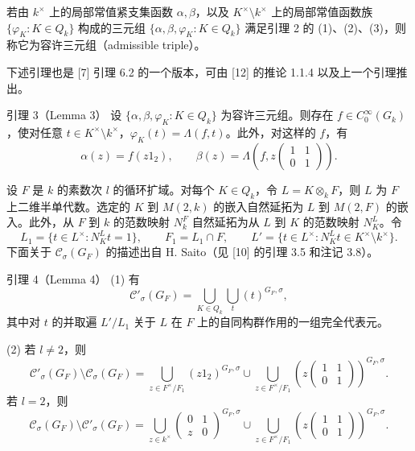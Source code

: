 若由 $k^\times$ 上的局部常值紧支集函数 $\alpha,\beta$，以及 $K^\times\setminus k^\times$ 上的局部常值函数族 $\{\varphi_K:K\in Q_k\}$ 构成的三元组 $\{\alpha,\beta,\varphi_K:K\in Q_k\}$ 满足引理 2 的 (1)、(2)、(3)，则称它为容许三元组（admissible triple）。

下述引理也是 [7] 引理 6.2 的一个版本，可由 [12] 的推论 1.1.4 以及上一个引理推出。

\begin{originaltheorem}{引理 3（Lemma 3）}
设 $\{\alpha,\beta,\varphi_K:K\in Q_k\}$ 为容许三元组。则存在 $f\in C_0^\infty(G_k)$，使对任意 $t\in K^\times\setminus k^\times$，$\varphi_K(t)=\Lambda(f,t)$。此外，对这样的 $f$，有
\[
 \alpha(z)=f(z1_2),\qquad
 \beta(z)=\Lambda\left(f,z\begin{pmatrix}1&1\\0&1\end{pmatrix}\right).
\]
\end{originaltheorem}

设 $F$ 是 $k$ 的素数次 $l$ 的循环扩域。对每个 $K\in Q_k$，令 $L=K\otimes_kF$，则 $L$ 为 $F$ 上二维半单代数。选定的 $K$ 到 $M(2,k)$ 的嵌入自然延拓为 $L$ 到 $M(2,F)$ 的嵌入。此外，从 $F$ 到 $k$ 的范数映射 $N_k^F$ 自然延拓为从 $L$ 到 $K$ 的范数映射 $N_K^L$。令
\[
 L_1=\{t\in L^\times:N_K^Lt=1\},\qquad F_1=L_1\cap F,
 \qquad L'=\{t\in L^\times:N_K^Lt\in K^\times\setminus k^\times\}.
\]
下面关于 $\mathcal C_\sigma(G_F)$ 的描述出自 H. Saito（见 [10] 的引理 3.5 和注记 3.8）。

\begin{originaltheorem}{引理 4（Lemma 4）}
(1) 有
\[
 \mathcal C'_\sigma(G_F)=\bigcup_{K\in Q_k}\bigcup_t(t)^{G_F,\sigma},
\]
其中对 $t$ 的并取遍 $L'/L_1$ 关于 $L$ 在 $F$ 上的自同构群作用的一组完全代表元。

(2) 若 $l\ne2$，则
\[
 \mathcal C'_\sigma(G_F)\setminus\mathcal C_\sigma(G_F)
 =\bigcup_{z\in F^\times/F_1}(z1_2)^{G_F,\sigma}
 \cup\bigcup_{z\in F^\times/F_1}
 \left(z\begin{pmatrix}1&1\\0&1\end{pmatrix}\right)^{G_F,\sigma}.
\]
若 $l=2$，则
\[
 \mathcal C_\sigma(G_F)\setminus\mathcal C'_\sigma(G_F)
 =\bigcup_{z\in k^\times}
 \begin{pmatrix}0&1\\z&0\end{pmatrix}^{G_F,\sigma}
 \cup\bigcup_{z\in F^\times/F_1}
 \left(z\begin{pmatrix}1&1\\0&1\end{pmatrix}\right)^{G_F,\sigma}.
\]
\end{originaltheorem}

